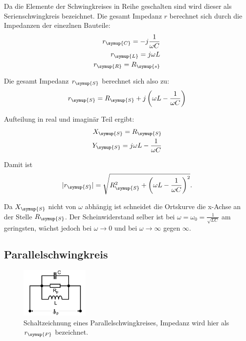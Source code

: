     \noindent Da die Elemente der Schwingkreises in Reihe geschalten sind wird dieser als Serienschwingkreis bezeichnet. Die gesamt Impedanz $r$ berechnet 
    sich durch die Impedanzen der einezlnen Bauteile:
    \begin{align}
        r_{\symup{C}} = -j\frac{1}{\omega C} \nonumber\\
        r_{\symup{L}} = j\omega L  \nonumber\\
        r_{\symup{R}} = R_{\symup{s}} \nonumber
    \end{align}

    \noindent Die gesamt Impedanz $r_{\symup{S}}$ berechnet sich also zu:
    \begin{equation}
        r_{\symup{S}} = R_{\symup{S}} + j \left(    \omega L - \frac{1}{\omega C} \right) \nonumber
    \end{equation}

    \noindent Aufteilung in real und imaginär Teil ergibt:
    \begin{align}
        X_{\symup{S}} = R_{\symup{S}}  \nonumber\\ 
        Y_{\symup{S}} = j \omega L - \frac{1}{\omega C} \nonumber
    \end{align}

    \noindent Damit ist
    \begin{equation}
        |r_{\symup{S}}| = \sqrt{R^2_{\symup{S}} + \left( \omega L - \frac{1}{\omega C} \right)^2} . \nonumber
    \end{equation}

    \noindent Da $X_{\symup{S}}$ nicht von $\omega$ abhängig ist schneidet die Ortskurve die x-Achse an der Stelle $R_{\symup{S}}$. Der Scheinwiderstand 
    selber ist bei $\omega = \omega_0 = \frac{1}{\sqrt{LC}}$ am geringsten, wächst jedoch bei $\omega \to 0$ und bei $\omega \to \infty$ 
    gegen $\infty$.


        \subsection{Parallelschwingkreis}
    
    
        \begin{figure}[H]
            \centering
            \includegraphics[width=0.3\textwidth]{images/Parallelschaltung.PNG}
            \caption{Schaltzeichnung eines Parallelschwingkreises, Impedanz wird hier als $r_{\symup{P}}$ bezeichnet.}
            \label{img:para}
        \end{figure}

